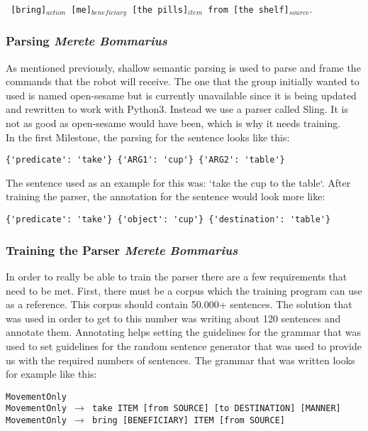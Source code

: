 \documentclass[main.tex]{subfiles}
\begin{document}
            \texttt{ [bring]$_{action}$  [me]$_{beneficiary}$ [the pills]$_{item}$ from [the shelf]$_{source}.$}
        \subsubsection{Parsing \small{\textit{Merete Bommarius}}}     
            As mentioned previously, shallow semantic parsing is used to parse and frame the commands that the robot will receive. The one that the group initially wanted to used is named open-sesame but is currently unavailable since it is being updated and rewritten to work with Python3. Instead we use a parser called Sling. It is not as good as open-sesame would have been, which is why it needs training.\\ 
            In the first Milestone, the parsing for the sentence looks like this:
    
\begin{lstlisting}
{'predicate': 'take'} {'ARG1': 'cup'} {'ARG2': 'table'}
\end{lstlisting}
            
            The sentence used as an example for this was: ‘take the cup to the table‘. After training the parser, the annotation for the sentence would look more like:
            
\begin{lstlisting}
{'predicate': 'take'} {'object': 'cup'} {'destination': 'table'}
\end{lstlisting}
            
        \subsubsection{Training the Parser \small{\textit{Merete Bommarius}}}
            In order to really be able to train the parser there are a few requirements that need to be met. First, there must be a corpus which the training program can use as a reference. This corpus should contain 50.000+ sentences. The solution that was used in order to get to this number was writing about 120 sentences and annotate them. Annotating helps setting the guidelines for the grammar that was used to set guidelines for the random sentence generator that was used to provide us with the required numbers of sentences.
            The grammar that was written looks for example like this:
            
            
\texttt{MovementOnly\\
                MovementOnly $\rightarrow$ take ITEM [from SOURCE] [to DESTINATION] [MANNER]\\
                MovementOnly $\rightarrow$ bring [BENEFICIARY] ITEM [from SOURCE]}
                
\end{document}
